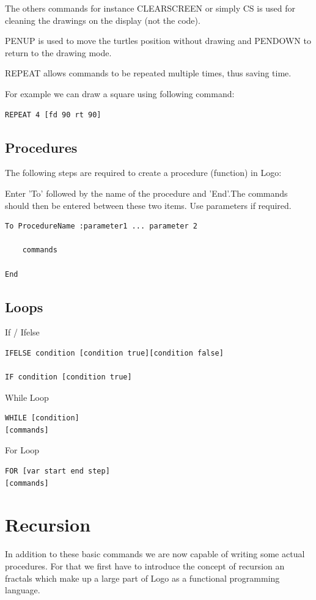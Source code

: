 \documentclass[a4paper, 11pt]{article}
\begin{document}
The others commands for instance CLEARSCREEN or simply CS is used for cleaning the drawings on the display (not the code).

PENUP is used to move the turtles position without drawing and PENDOWN to return to the drawing mode.

REPEAT allows commands to be repeated multiple times, thus saving time. 

For example we can draw a square using following command:

\begin{lstlisting}
REPEAT 4 [fd 90 rt 90]
\end{lstlisting}

\subsection{Procedures}
\label{sec:proced}
The following steps are required to create a procedure (function) in Logo: 

Enter 'To' followed by the name of the procedure and 'End'.The commands should then be entered between these two items. Use parameters if required.

\begin{lstlisting}
To ProcedureName :parameter1 ... parameter 2

    commands

End

\end{lstlisting}


\subsection{Loops}
\label{sec:loop}
If / Ifelse
\begin{lstlisting}
IFELSE condition [condition true][condition false]

IF condition [condition true]
\end{lstlisting}

While Loop
\begin{lstlisting}
WHILE [condition]
[commands]
\end{lstlisting}

For Loop
\begin{lstlisting}
FOR [var start end step]
[commands]

\end{lstlisting}

\section{Recursion}
In addition to these basic commands we are now capable of writing some actual procedures.
For that we first have to introduce the concept of recursion an fractals which make up a large part of Logo as a functional programming language.
\end{document}
